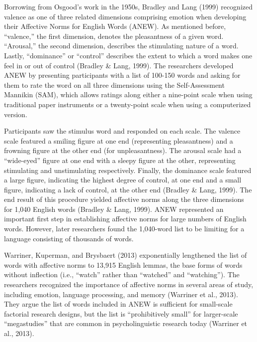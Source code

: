 \documentclass[,man]{apa6}
\begin{document}
Borrowing from Osgood's work in the 1950s, Bradley and Lang (1999)
recognized valence as one of three related dimensions comprising emotion
when developing their Affective Norms for English Words (ANEW). As
mentioned before, \enquote{valence,} the first dimension, denotes the
pleasantness of a given word. \enquote{Arousal,} the second dimension,
describes the stimulating nature of a word. Lastly, \enquote{dominance}
or \enquote{control} describes the extent to which a word makes one feel
in or out of control (Bradley \& Lang, 1999). The researchers developed
ANEW by presenting participants with a list of 100-150 words and asking
for them to rate the word on all three dimensions using the
Self-Assessment Mannikin (SAM), which allows ratings along either a
nine-point scale when using traditional paper instruments or a
twenty-point scale when using a computerized version.

Participants saw the stimulus word and responded on each scale. The
valence scale featured a smiling figure at one end (representing
pleasantness) and a frowning figure at the other end (for
unpleasantness). The arousal scale had a \enquote{wide-eyed} figure at
one end with a sleepy figure at the other, representing stimulating and
unstimulating respectively. Finally, the dominance scale featured a
large figure, indicating the highest degree of control, at one end and a
small figure, indicating a lack of control, at the other end (Bradley \&
Lang, 1999). The end result of this procedure yielded affective norms
along the three dimensions for 1,040 English words (Bradley \& Lang,
1999). ANEW represented an important first step in establishing
affective norms for large numbers of English words. However, later
researchers found the 1,040-word list to be limiting for a language
consisting of thousands of words.

Warriner, Kuperman, and Brysbaert (2013) exponentially lengthened the
list of words with affective norms to 13,915 English lemmas, the base
forms of words without inflection (i.e., \enquote{watch} rather than
\enquote{watched} and \enquote{watching}). The researchers recognized
the importance of affective norms in several areas of study, including
emotion, language processing, and memory (Warriner et al., 2013). They
argue the list of words included in ANEW is sufficient for small-scale
factorial research designs, but the list is \enquote{prohibitively
small} for larger-scale \enquote{megastudies} that are common in
psycholinguistic research today (Warriner et al., 2013).
\end{document}
